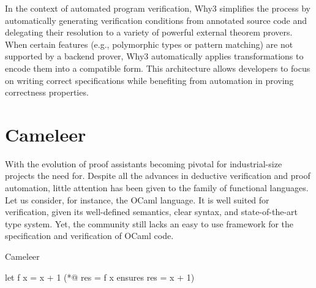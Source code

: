 In the context of automated program verification, Why3 simplifies the process by automatically generating verification 
conditions from annotated source code and delegating their resolution to a variety of powerful external theorem provers. 
When certain features (e.g., polymorphic types or pattern matching) are not supported by a backend prover, Why3 automatically 
applies transformations to encode them into a compatible form. This architecture allows developers to focus on writing 
correct specifications while benefiting from automation in proving correctness properties.~\cite{boogie11why3}

\section{Cameleer}
\label{sec:Cameleer}

With the evolution of proof assistants becoming pivotal for industrial-size projects the need for. Despite all the advances in 
deductive verification and proof automation, little attention has been given to the family of functional languages. Let us
consider, for instance, the OCaml language. It is well suited for verification, given its well-defined semantics, clear syntax, 
and state-of-the-art type system. Yet, the community still lacks an easy to use framework for the specification and
verification of OCaml code.

Cameleer ~\cite{PereiraR20}

\begin{gospell}
  let f x = x + 1 (*@ res = f x ensures res = x + 1)
\end{gospell}